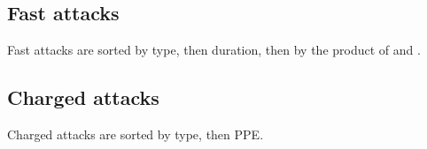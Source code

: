 \subsection{Fast attacks\label{sec:usersfast}}
Fast attacks are sorted by type, then duration, then by the product of \PPT{} and \EPT{}\@.

\subsection{Charged attacks\label{sec:userscharged}}
Charged attacks are sorted by type, then PPE\@.

